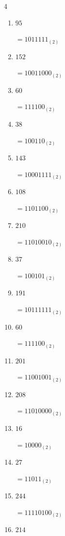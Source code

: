 \begin{multicols}{4}
\begin{enumerate}
        $=10100101_{(2)}$

  \item $95$

        $=1011111_{(2)}$

  \item $152$

        $=10011000_{(2)}$

  \item $60$

        $=111100_{(2)}$

\columnbreak %

  \item $38$

        $=100110_{(2)}$

  \item $143$

        $=10001111_{(2)}$

  \item $108$

        $=1101100_{(2)}$

  \item $210$

        $=11010010_{(2)}$

  \item $37$

        $=100101_{(2)}$

  \item $191$

        $=10111111_{(2)}$

  \item $60$

        $=111100_{(2)}$

  \item $201$

        $=11001001_{(2)}$

  \item $208$

        $=11010000_{(2)}$

  \item $16$

        $=10000_{(2)}$

  \item $27$

        $=11011_{(2)}$

  \item $244$

        $=11110100_{(2)}$

  \item $214$


\end{enumerate}
\end{multicols}
